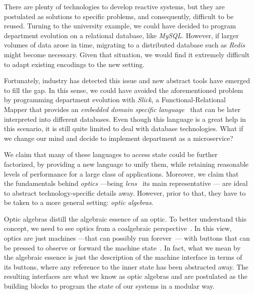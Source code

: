 \documentclass[a4paper]{article}
\begin{document}
There are plenty of technologies to develop reactive systems, but they are
postulated as solutions to specific problems, and consequently, difficult to be
reused. Turning to the university example, we could have decided to program
department evolution on a relational database, like \emph{MySQL}. However, if
larger volumes of data arose in time, migrating to a distributed database such
as \emph{Redis} might become necessary. Given that situation, we would find it
extremely difficult to adapt existing encodings to the new setting.

Fortunately, industry has detected this issue and new abstract tools have
emerged to fill the gap. In this sense, we could have avoided the aforementioned
problem by programming department evolution with \emph{Slick}, a
Functional-Relational Mapper that provides an \emph{embedded domain specific
language}~\cite{hudak1996building} that can be later interpreted into different
databases. Even though this language is a great help in this scenario, it is
still quite limited to deal with database technologies. What if we change our
mind and decide to implement department as a microservice?

We claim that many of these languages to access state could be further
factorized, by providing a new language to unify them, while retaining
reasonable levels of performance for a large class of applications. Moreover, we
claim that the fundamentals behind \emph{optics} ---being
\emph{lens}~\cite{foster2005combinators} its main representative --- are ideal
to abstract technology-specific details away. However, prior to that, they have
to be taken to a more general setting: \emph{optic algebras}.


Optic algebras distill the algebraic essence of an optic. To better understand
this concept, we need to see optics from a coalgebraic
perspective~\cite{jacobs2016introduction}. In this view, optics are just
machines ---that can possibly run forever~\cite{turner2004total}--- with buttons
that can be pressed to observe or forward the machine
state~\cite{jacobs1997tutorial}. In fact, what we mean by the algebraic essence
is just the description of the machine interface in terms of its buttons, where
any reference to the inner state has been abstracted away. The resulting
interfaces are what we know as optic algebras and are postulated as the building
blocks to program the state of our systems in a modular way.

\end{document}
